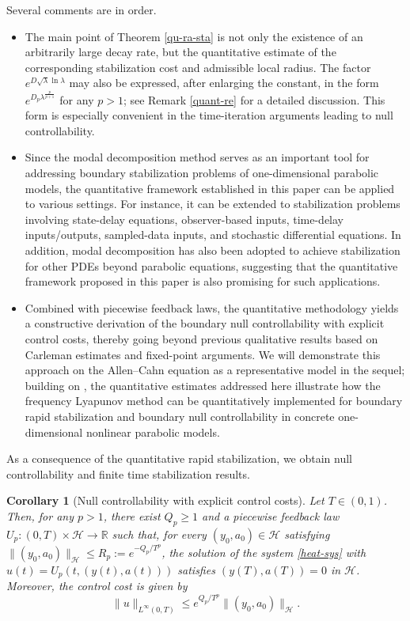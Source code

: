 \documentclass[a4paper]{article}
\newtheorem{corollary}[theorem]{Corollary}
\numberwithin{equation}{section}
\begin{document}
\begin{remark}\label{remark2-control}
Several comments are in order.
\begin{itemize}
\item[1.] The main point of Theorem \ref{qu-ra-sta} is not only the existence of an arbitrarily large decay rate, but the quantitative estimate of the corresponding stabilization cost and admissible local radius. The factor $e^{D\sqrt{\lambda}\ln\lambda}$ may also be expressed, after enlarging the constant, in the form $e^{D_p\lambda^{\frac{p}{p+1}}}$ for any $p>1$; see Remark \ref{quant-re} for a detailed discussion. This form is especially convenient in the time-iteration arguments leading to null controllability.

\item[2.] Since the modal decomposition method serves as an important tool for addressing boundary stabilization problems of one-dimensional parabolic models, the quantitative framework established in this paper can be applied to various settings. For instance, it can be extended to stabilization problems involving state-delay equations, observer-based inputs, time-delay inputs/outputs, sampled-data inputs, and stochastic differential equations. In addition, modal decomposition has also been adopted to achieve stabilization for other PDEs beyond parabolic equations, suggesting that the quantitative framework proposed in this paper is also promising for such applications.

\item[3.] Combined with piecewise feedback laws, the quantitative methodology yields a constructive derivation of the boundary null controllability with explicit control costs, thereby going beyond previous qualitative results based on Carleman estimates and fixed-point arguments. We will demonstrate this approach on the Allen--Cahn equation as a representative model in the sequel; building on \cite{X,XZ}, the quantitative estimates addressed here illustrate how the frequency Lyapunov method can be quantitatively implemented for boundary rapid stabilization and boundary null controllability in concrete one-dimensional nonlinear parabolic models.
\end{itemize} 
\end{remark}

As a consequence of the quantitative rapid stabilization, we obtain null controllability and finite time stabilization results.
\begin{corollary}[Null controllability with explicit control costs]\label{main-th-null-control}
Let $T \in (0,1) $. Then, for any $p>1$, there exist ${Q}_p \geq 1$ and a piecewise feedback law $U_p:(0,T)\times \mathcal{H}\to \mathbb{R}$ such that, for every $(y_0,a_0)\in\mathcal{H}$ satisfying $\|(y_0,a_0)\|_{\mathcal{H}}\leq R_p:=e^{-{{Q}_p}/{T^p}}$, the solution of the system \eqref{heat-sys} with $u(t)=U_p(t,(y(t),a(t)))$ satisfies $(y(T),a(T))=0$ in $\mathcal{H}$. Moreover, the control cost is given by 
\begin{equation}\label{new-2-1}
 \|u\|_{L^\infty(0,T)}\le e^{{{Q}_p}/{T^p}} \|(y_0,a_0)\|_{\mathcal{H}}.
\end{equation}
\end{corollary}
\end{document}
